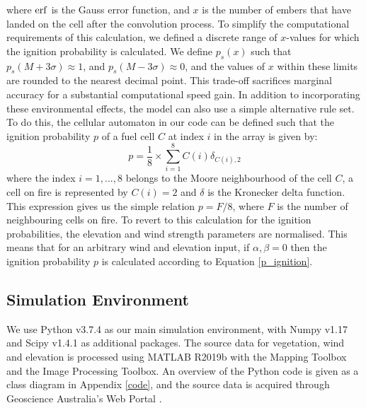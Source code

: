 \noindent where $\erf$ is the Gauss error function, and $x$ is the number of embers that have landed on the cell after the convolution process. To simplify the computational requirements of this calculation, we defined a discrete range of $x$-values for which the ignition probability is calculated. We define $p_s(x)$ such that $p_s(M+3\sigma) \approx 1$, and $p_s(M-3\sigma) \approx 0$, and the values of $x$ within these limits are rounded to the nearest decimal point. This trade-off sacrifices marginal accuracy for a substantial computational speed gain. \newline
\indent In addition to incorporating these environmental effects, the model can also use a simple alternative rule set. To do this, the cellular automaton in our code can be defined such that the ignition probability $p$ of a fuel cell $C$ at index $i$ in the array is given by:
\begin{equation}\label{p_ignition}
    p = \frac{1}{8} \times \sum_{i=1}^8 C(i) \delta_{C(i),2}
\end{equation}
where the index $i = 1,...,8$ belongs to the Moore neighbourhood of the cell $C$, a cell on fire is represented by $C(i)=2$ and $\delta$ is the Kronecker delta function. This expression gives us the simple relation $p=F/8$, where $F$ is the number of neighbouring cells on fire. To revert to this calculation for the ignition probabilities, the elevation and wind strength parameters are normalised. This means that for an arbitrary wind and elevation input, if $\alpha,\beta=0$ then the ignition probability $p$ is calculated according to Equation \ref{p_ignition}.

\subsection{Simulation Environment}

We use Python v3.7.4 as our main simulation environment, with Numpy v1.17 and Scipy v1.4.1 as additional packages. The source data for vegetation, wind and elevation is processed using MATLAB R2019b with the Mapping Toolbox\texttrademark{} and the Image Processing Toolbox\texttrademark{}. An overview of the Python code is given as a class diagram in Appendix \ref{code}, and the source data is acquired through Geoscience Australia's Web Portal \cite{Geodata}.